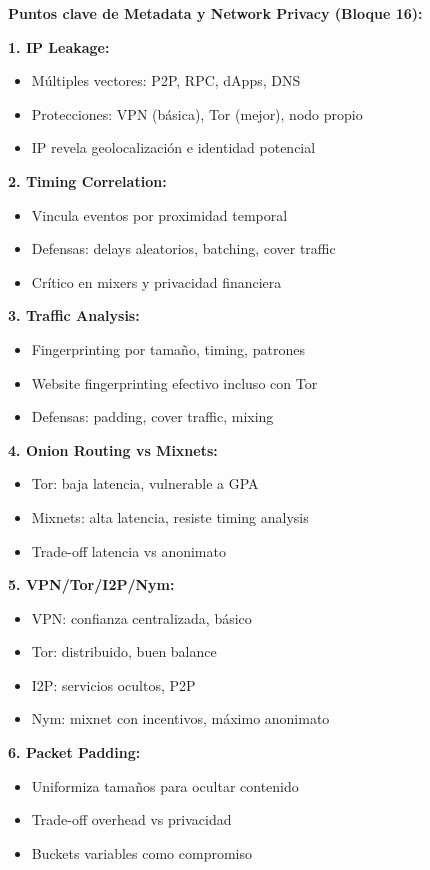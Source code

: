 \documentclass[11pt,a4paper,twoside]{book}
\theoremstyle{definition}
\theoremstyle{remark}
\begin{document}
\begin{keyidea}
\textbf{Puntos clave de Metadata y Network Privacy (Bloque 16):}

\textbf{1. IP Leakage:}
\begin{itemize}
    \item Múltiples vectores: P2P, RPC, dApps, DNS
    \item Protecciones: VPN (básica), Tor (mejor), nodo propio
    \item IP revela geolocalización e identidad potencial
\end{itemize}

\textbf{2. Timing Correlation:}
\begin{itemize}
    \item Vincula eventos por proximidad temporal
    \item Defensas: delays aleatorios, batching, cover traffic
    \item Crítico en mixers y privacidad financiera
\end{itemize}

\textbf{3. Traffic Analysis:}
\begin{itemize}
    \item Fingerprinting por tamaño, timing, patrones
    \item Website fingerprinting efectivo incluso con Tor
    \item Defensas: padding, cover traffic, mixing
\end{itemize}

\textbf{4. Onion Routing vs Mixnets:}
\begin{itemize}
    \item Tor: baja latencia, vulnerable a GPA
    \item Mixnets: alta latencia, resiste timing analysis
    \item Trade-off latencia vs anonimato
\end{itemize}

\textbf{5. VPN/Tor/I2P/Nym:}
\begin{itemize}
    \item VPN: confianza centralizada, básico
    \item Tor: distribuido, buen balance
    \item I2P: servicios ocultos, P2P
    \item Nym: mixnet con incentivos, máximo anonimato
\end{itemize}

\textbf{6. Packet Padding:}
\begin{itemize}
    \item Uniformiza tamaños para ocultar contenido
    \item Trade-off overhead vs privacidad
    \item Buckets variables como compromiso
\end{itemize}


\end{keyidea}
\end{document}
